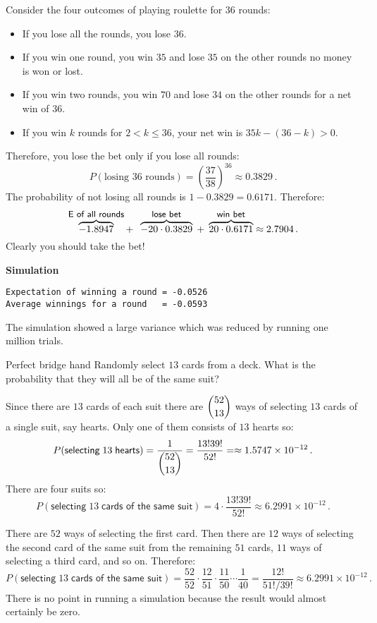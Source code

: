 Consider the four outcomes of playing roulette for $36$ rounds:
\begin{itemize}
\item If you lose all the rounds, you lose $36$.
\item If you win one round, you win $35$ and lose $35$ on the other rounds no money is won or lost.
\item If you win two rounds, you win $70$ and lose $34$ on the other rounds for a net win of $36$.
\item If you win $k$ rounds for $2<k\leq 36$, your net win is $35k - (36-k)>0$.
\end{itemize}
Therefore, you lose the bet only if you lose all rounds:
\[
P(\textrm{losing\ } 36 \textrm{\ rounds})=\left(\frac{37}{38}\right)^{36}\approx 0.3829\,.
\]
The probability of not losing all rounds is $1-0.3829=0.6171$. Therefore:
\[
\overbrace{-1.8947}^{\textsf{\small E of all rounds}}+\;\;
\overbrace{-20\cdot 0.3829}^{\textsf{\small lose bet}} \;+\; \overbrace{20\cdot 0.6171}^{\textsf{\small win bet}} \approx 2.7904\,.
\]
Clearly you should take the bet!

\textbf{Simulation}
\begin{verbatim}
Expectation of winning a round = -0.0526
Average winnings for a round   = -0.0593
\end{verbatim}
The simulation showed a large variance which was reduced by running one million trials.


\begin{prob}{Perfect bridge hand}
Randomly select $13$ cards from a deck. What is the probability that they will all be of the same suit?
\end{prob}


Since there are $13$ cards of each suit there are $\displaystyle{52 \choose 13}$ ways of selecting $13$ cards of a single suit, say hearts. Only one of them consists of $13$ hearts so:
\[
P(\textsf{selecting}\;13\;\textsf{hearts})=\frac{1}{\displaystyle{52 \choose 13}}=\frac{13! 39!}{52!}=\approx 1.5747\times 10^{-12}\,.
\]
There are four suits so:
\[
P(\textsf{selecting}\;13\;\textsf{cards of the same suit})=4\cdot \frac{13! 39!}{52!}\approx 6.2991\times 10^{-12}\,.
\]


There are $52$ ways of selecting the first card. Then there are $12$ ways of selecting the second card of the same suit from the remaining $51$ cards, $11$ ways of selecting a third card, and so on. Therefore:
\[
P(\textsf{selecting}\;13\;\textsf{cards of the same suit})=\frac{52}{52}\cdot \frac{12}{51}\cdot \frac{11}{50} \cdots  \frac{1}{40}= \frac{12!}{51!/39!}\approx 6.2991\times 10^{-12}\,.
\]
There is no point in running a simulation because the result would almost certainly be zero.

